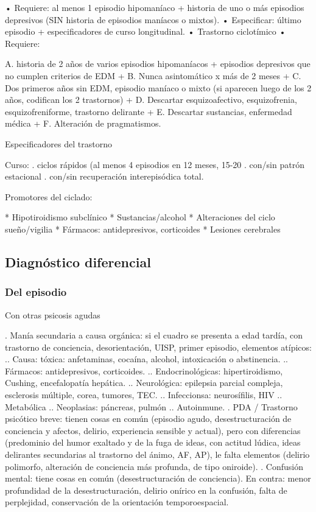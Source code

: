 • Requiere: al menos 1 episodio hipomaníaco + historia de uno o más episodios depresivos (SIN historia de episodios maníacos o mixtos).
• Especificar: último episodio + especificadores de curso longitudinal.
• Trastorno ciclotímico
• Requiere:

A. historia de 2 años de varios episodios hipomaníacos + episodios depresivos que no cumplen criterios de EDM +
B. Nunca asintomático x más de 2 meses +
C. Dos primeros años sin EDM, episodio maníaco o mixto (si aparecen luego de los 2 años, codifican los 2 trastornos) +
D. Descartar esquizoafectivo, esquizofrenia, esquizofreniforme, trastorno delirante +
E. Descartar sustancias, enfermedad médica +
F. Alteración de pragmatismos.

Especificadores del trastorno

Curso:
. ciclos rápidos (al menos 4 episodios en 12 meses, 15-20%
. con/sin patrón estacional
. con/sin recuperación interepisódica total.

Promotores del ciclado:

* Hipotiroidismo subclínico
* Sustancias/alcohol
* Alteraciones del ciclo sueño/vigilia
* Fármacos: antidepresivos, corticoides
* Lesiones cerebrales

\subsection*{Diagnóstico diferencial}
\subsubsection*{Del episodio}
Con otras psicosis agudas

. Manía secundaria a causa orgánica: si el cuadro se presenta a edad tardía, con trastorno de conciencia, desorientación, UISP, primer episodio, elementos atípicos:
.. Causa: tóxica: anfetaminas, cocaína, alcohol, intoxicación o abstinencia.
.. Fármacos: antidepresivos, corticoides.
.. Endocrinológicas: hipertiroidismo, Cushing, encefalopatía hepática.
.. Neurológica: epilepsia parcial compleja, esclerosis múltiple, corea, tumores, TEC.
.. Infeccionsa: neurosífilis, HIV
.. Metabólica
.. Neoplasias: páncreas, pulmón
.. Autoinmune.
. PDA / Trastorno psicótico breve: tienen cosas en común (episodio agudo, desestructuración de conciencia y afectos, delirio, experiencia sensible y actual), pero con diferencias (predominio del humor exaltado y de la fuga de ideas, con actitud lúdica, ideas delirantes secundarias al trastorno del ánimo, AF, AP), le falta elementos (delirio polimorfo, alteración de conciencia más profunda, de tipo oniroide).
. Confusión mental: tiene cosas en común (desestructuración de conciencia). En contra: menor profundidad de la desestructuración, delirio onírico en la confusión, falta de perplejidad, conservación de la orientación temporoespacial.

